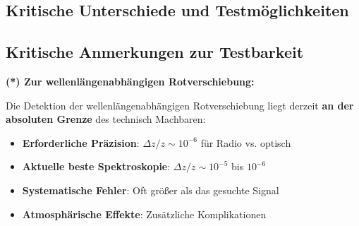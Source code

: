 \subsection{Kritische Unterschiede und Testmöglichkeiten}
\label{subsec:critical_differences}

\begin{table}[h]
	\centering
	\caption{Fundamentale Unterschiede zwischen $\Lambda$CDM und T0}
\end{table}

\subsection{Kritische Anmerkungen zur Testbarkeit}
\label{subsec:testability_notes}

\textbf{(*) Zur wellenlängenabhängigen Rotverschiebung:}

Die Detektion der wellenlängenabhängigen Rotverschiebung liegt derzeit \textbf{an der absoluten Grenze} des technisch Machbaren:

\begin{itemize}
	\item \textbf{Erforderliche Präzision}: $\Delta z/z \sim 10^{-6}$ für Radio vs. optisch
	\item \textbf{Aktuelle beste Spektroskopie}: $\Delta z/z \sim 10^{-5}$ bis $10^{-6}$
	\item \textbf{Systematische Fehler}: Oft größer als das gesuchte Signal
	\item \textbf{Atmosphärische Effekte}: Zusätzliche Komplikationen
\end{itemize}

